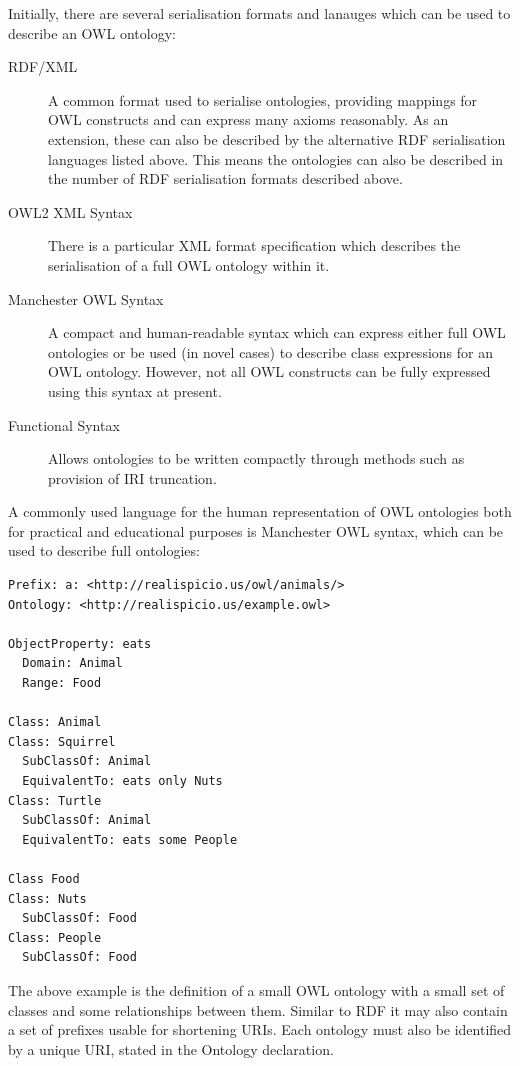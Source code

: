 \documentclass{article}
\begin{document}
Initially, there are several serialisation formats and lanauges which can be
used to describe an OWL ontology:

\begin{description}
    \item[RDF/XML] A common format used to serialise ontologies, providing
    mappings for OWL constructs and can express many axioms
    reasonably. As an extension, these can also be described by the alternative
    RDF serialisation languages listed above. This means the ontologies can also
    be described in the number of RDF serialisation formats described above.
    \item[OWL2 XML Syntax] There is a particular XML format specification which
    describes the serialisation of a full OWL ontology within it.\cite{owl2xml}
    \item[Manchester OWL Syntax] A compact and human-readable syntax which can express
    either full OWL ontologies or be used (in novel cases) to describe class
    expressions for an OWL ontology. However, not all OWL constructs can be fully
    expressed using this syntax at present.\cite{manchesterowl}
    \item[Functional Syntax] Allows ontologies to be written compactly through
    methods such as provision of IRI truncation.
\end{description}

A commonly used language for the human representation of OWL ontologies both for
practical and educational purposes is Manchester OWL syntax, which can be used to 
describe full ontologies:

\begin{lstlisting}
Prefix: a: <http://realispicio.us/owl/animals/>
Ontology: <http://realispicio.us/example.owl>

ObjectProperty: eats
  Domain: Animal
  Range: Food

Class: Animal
Class: Squirrel
  SubClassOf: Animal
  EquivalentTo: eats only Nuts
Class: Turtle
  SubClassOf: Animal
  EquivalentTo: eats some People

Class Food
Class: Nuts
  SubClassOf: Food
Class: People
  SubClassOf: Food
\end{lstlisting}

The above example is the definition of a small OWL ontology with a small set of 
classes and some relationships between them. Similar to RDF it
may also contain a set of prefixes usable for shortening URIs. Each ontology
must also be identified by a unique URI, stated in the Ontology declaration.
\end{document}
